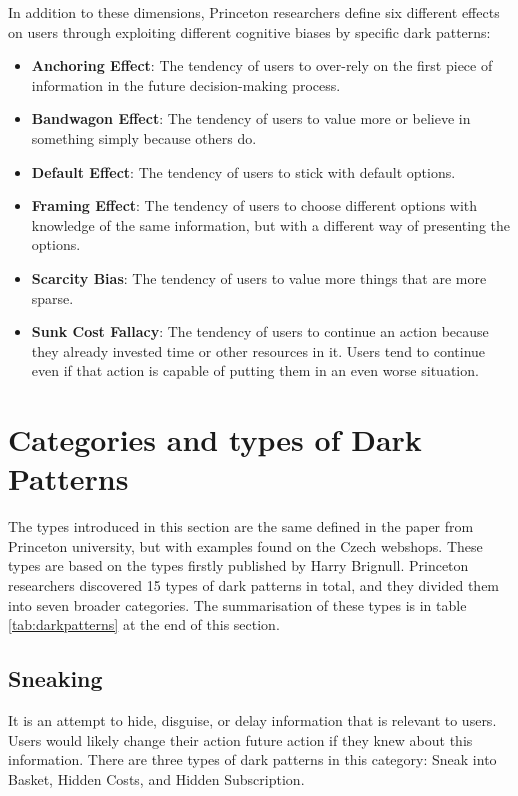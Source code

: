 In addition to these dimensions, Princeton researchers define six different effects on users through exploiting different cognitive biases by specific dark patterns:

\begin{itemize}
    \item \textbf{Anchoring Effect}: The tendency of users to over-rely on the first piece of information in the future decision-making process.
    \item \textbf{Bandwagon Effect}: The tendency of users to value more or believe in something simply because others do.
    \item \textbf{Default Effect}: The tendency of users to stick with default options.
    \item \textbf{Framing Effect}: The tendency of users to choose different options with knowledge of the same information, but with a different way of presenting the options.
    \item \textbf{Scarcity Bias}: The tendency of users to value more things that are more sparse.
    \item \textbf{Sunk Cost Fallacy}: The tendency of users to continue an action because they already invested time or other resources in it. Users tend to continue even if that action is capable of putting them in an even worse situation.
\end{itemize}

\section{Categories and types of Dark Patterns}
The types introduced in this section are the same defined in the paper from Princeton university\cite{dark-patterns-at-scale}, but with examples found on the Czech webshops. These types are based on the types firstly published by Harry Brignull\cite{dark-patterns-brignull}.
Princeton researchers discovered 15 types of dark patterns in total, and they divided them into seven broader categories. The summarisation of these types is in table \ref{tab:darkpatterns} at the end of this section.
    \subsection{Sneaking}
    It is an attempt to hide, disguise, or delay information that is relevant to users. Users would likely change their action future action if they knew about this information. There are three types of dark patterns in this category: Sneak into Basket, Hidden Costs, and Hidden Subscription.
